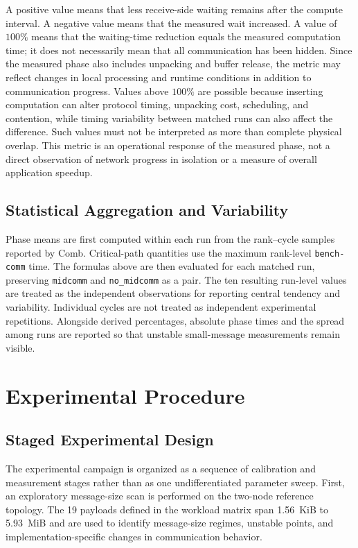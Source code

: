 A positive value means that less receive-side waiting remains after the
compute interval. A negative value means that the measured wait increased.
A value of $100\%$ means that the waiting-time reduction equals the measured
computation time; it does not necessarily mean that all communication has been
hidden. Since the measured phase also includes unpacking and buffer release,
the metric may reflect changes in local processing and runtime conditions in
addition to communication progress. Values above $100\%$ are possible because
inserting computation can alter protocol timing, unpacking cost, scheduling,
and contention, while timing variability between matched runs can also affect
the difference. Such values must not be interpreted as more than complete
physical overlap. This metric is an operational response of the measured phase,
not a direct observation of network progress in isolation or a measure of
overall application speedup.



\subsection{Statistical Aggregation and Variability}

Phase means are first computed within each run from the rank--cycle samples
reported by Comb. Critical-path quantities use the maximum rank-level
\texttt{bench-comm} time. The formulas above are then evaluated for each
matched run, preserving \texttt{midcomm} and \texttt{no\_midcomm} as a pair.
The ten resulting run-level values are treated as the independent
observations for reporting central tendency and variability. Individual
cycles are not treated as independent experimental repetitions. Alongside
derived percentages, absolute phase times and the spread among runs are
reported so that unstable small-message measurements remain visible.

\section{Experimental Procedure}

\subsection{Staged Experimental Design}

The experimental campaign is organized as a sequence of calibration and
measurement stages rather than as one undifferentiated parameter sweep.
First, an exploratory message-size scan is performed on the two-node reference
topology. The 19 payloads defined in the workload matrix span 1.56~KiB to
5.93~MiB and are used to identify message-size regimes, unstable points, and
implementation-specific changes in communication behavior.

